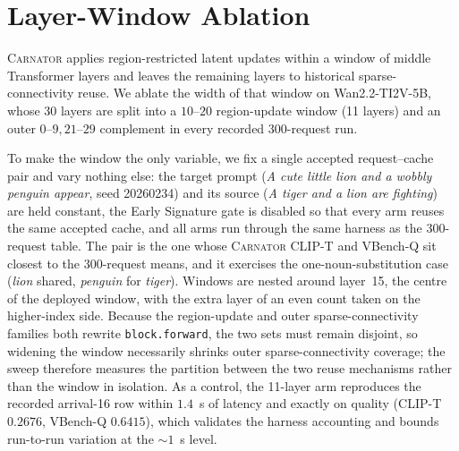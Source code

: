 \section{Layer-Window Ablation}
\label{sec:app-layer-window}

\textsc{Carnator} applies region-restricted latent updates within a window of middle Transformer
layers and leaves the remaining layers to historical sparse-connectivity reuse. We ablate the width
of that window on Wan2.2-TI2V-5B, whose 30 layers are split into a $10$--$20$ region-update window
(11 layers) and an outer $0$--$9,21$--$29$ complement in every recorded 300-request run.

To make the window the only variable, we fix a single accepted request--cache pair and vary nothing
else: the target prompt (\emph{A cute little lion and a wobbly penguin appear}, seed 20260234) and
its source (\emph{A tiger and a lion are fighting}) are held constant, the Early Signature gate is
disabled so that every arm reuses the same accepted cache, and all arms run through the same harness
as the 300-request table. The pair is the one whose \textsc{Carnator} CLIP-T and VBench-Q sit closest
to the 300-request means, and it exercises the one-noun-substitution case (\emph{lion} shared,
\emph{penguin} for \emph{tiger}). Windows are nested around layer~15, the centre of the deployed
window, with the extra layer of an even count taken on the higher-index side. Because the
region-update and outer sparse-connectivity families both rewrite \texttt{block.forward}, the two
sets must remain disjoint, so widening the window necessarily shrinks outer sparse-connectivity
coverage; the sweep therefore measures the partition between the two reuse mechanisms rather than the
window in isolation. As a control, the 11-layer arm reproduces the recorded arrival-16 row within
$1.4$~s of latency and exactly on quality (CLIP-T $0.2676$, VBench-Q $0.6415$), which validates the
harness accounting and bounds run-to-run variation at the $\sim1$~s level.

